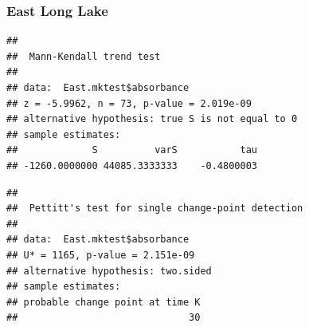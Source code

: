 \documentclass[12pt,]{article}
\newenvironment{Shaded}{\begin{snugshade}}{\end{snugshade}}
\newcommand{\KeywordTok}[1]{\textcolor[rgb]{0.13,0.29,0.53}{\textbf{#1}}}
\newcommand{\DecValTok}[1]{\textcolor[rgb]{0.00,0.00,0.81}{#1}}
\newcommand{\StringTok}[1]{\textcolor[rgb]{0.31,0.60,0.02}{#1}}
\newcommand{\CommentTok}[1]{\textcolor[rgb]{0.56,0.35,0.01}{\textit{#1}}}
\newcommand{\OperatorTok}[1]{\textcolor[rgb]{0.81,0.36,0.00}{\textbf{#1}}}
\newcommand{\NormalTok}[1]{#1}
\begin{document}
\subsubsection{East Long Lake}\label{east-long-lake}

\begin{Shaded}
\end{Shaded}

\begin{verbatim}
## 
##  Mann-Kendall trend test
## 
## data:  East.mktest$absorbance
## z = -5.9962, n = 73, p-value = 2.019e-09
## alternative hypothesis: true S is not equal to 0
## sample estimates:
##             S          varS           tau 
## -1260.0000000 44085.3333333    -0.4800003
\end{verbatim}

\begin{Shaded}
\end{Shaded}

\begin{verbatim}
## 
##  Pettitt's test for single change-point detection
## 
## data:  East.mktest$absorbance
## U* = 1165, p-value = 2.151e-09
## alternative hypothesis: two.sided
## sample estimates:
## probable change point at time K 
##                              30
\end{verbatim}

\begin{Shaded}
\end{Shaded}
\end{document}
